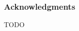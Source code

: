 \documentclass[11pt]{report} %
\begin{document}



\tableofcontents









%

%

%




\subsubsection*{Acknowledgments}
\label{sec:ack}
TODO



\appendix
%
\end{document}
